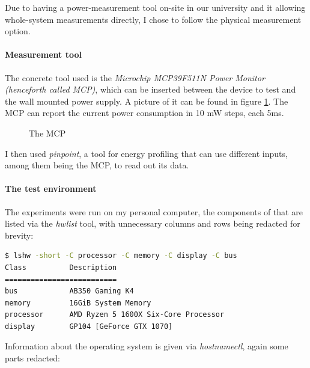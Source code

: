 Due to having a power-measurement tool on-site in our university and it allowing whole-system measurements directly, I chose to follow the physical measurement option. 

\paragraph{Measurement tool}

The concrete tool used is the \emph{Microchip MCP39F511N Power Monitor (henceforth called MCP)}, which can be inserted between the device to test and the wall mounted power supply. A picture of it can be found in figure \ref{fig:mcp}. The MCP can report the current power consumption in 10 mW steps, each 5ms.

\begin{figure}
    \caption[short]{The MCP}
    \label{fig:mcp}
\end{figure}


I then used \emph{pinpoint}, a tool for energy profiling that can use different inputs, among them being the MCP, to read out its data. 

\paragraph{The test environment}

The experiments were run on my personal computer, the components of that are listed via the \emph{hwlist} tool, with unnecessary columns and rows being redacted for brevity:

\begin{lstlisting}[language=bash, frame=single, numbers=none, caption={Hardware environment of the measurements}, basicstyle=\ttfamily]
   $ lshw -short -C processor -C memory -C display -C bus
Class          Description
==========================
bus            AB350 Gaming K4
memory         16GiB System Memory
processor      AMD Ryzen 5 1600X Six-Core Processor
display        GP104 [GeForce GTX 1070]
\end{lstlisting}

Information about the operating system is given via \emph{hostnamectl}, again some parts redacted:

